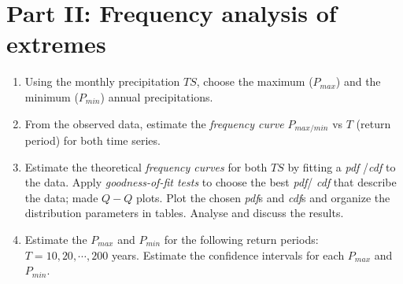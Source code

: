 \documentclass[10pt, a4paper]{exam}
\begin{document}
\section{Part II: Frequency analysis of extremes}
\begin{enumerate}
    \item Using the monthly precipitation $TS$, choose the maximum ($P_{max}$) and the minimum ($P_{min}$) annual precipitations. 

    \item From the observed data, estimate the \emph{frequency curve} $P_{max/min}$ vs $T$ (return period) for both time series.  

    \item Estimate the theoretical \emph{frequency curves} for both $TS$ by fitting a \emph{pdf} /\emph{cdf} to the data. Apply \emph{goodness-of-fit tests} to choose the best \emph{pdf}/ \emph{cdf} that describe the data; made $Q-Q$ plots.  Plot the chosen \emph{pdf}s and \emph{cdf}s and  organize the distribution parameters in tables. Analyse and discuss the results. 

    \item Estimate the $P_{max}$ and $P_{min}$ for the following return periods: $T = 10, 20, \cdots, 200$ years. Estimate the confidence intervals for each $P_{max}$ and $P_{min}$. 
\end{enumerate}
    
\end{document}
